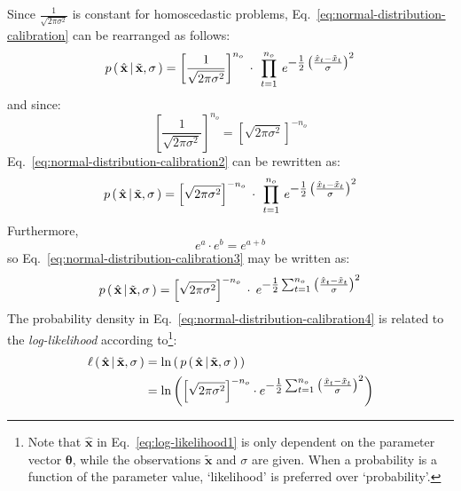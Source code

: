 \vspace{1em}
Since $\frac{1}{\sqrt{2\pi\sigma^2}}$ is constant for homoscedastic problems, Eq.~\ref{eq:normal-distribution-calibration} can be rearranged as follows:
\begin{equation}\label{eq:normal-distribution-calibration2}
p\,(\,\hat{\mathbf{x}}\,|\,\tilde{\mathbf{x}},\sigma\,) = \left[\frac{1}{\sqrt{2\pi\sigma^2}}\right]^{n_o}\:\cdot{}\:\prod_{t=1}^{n_o}\:e^\mathlarger{-\frac{1}{2}\left(\frac{\hat{x}_t-\tilde{x}_t}{\sigma}\right)^2}
\end{equation}
and since:
\begin{equation}
\left[\frac{1}{\sqrt{2\pi\sigma^2}}\right]^{n_o} = \left[\sqrt{2\pi\sigma^2}\right]^{-n_o} \nonumber
\end{equation}
Eq.~\ref{eq:normal-distribution-calibration2} can be rewritten as:
\begin{equation}\label{eq:normal-distribution-calibration3}
p\,(\,\hat{\mathbf{x}}\,|\,\tilde{\mathbf{x}},\sigma\,) = \left[\sqrt{2\pi\sigma^2}\right]^{-n_o}\:\cdot{}\:\prod_{t=1}^{n_o}\:e^\mathlarger{-\frac{1}{2}\left(\frac{\hat{x}_t-\tilde{x}_t}{\sigma}\right)^2}
\end{equation}
Furthermore,
\begin{equation}
e^a\cdot{}e^b=e^{a+b}
\end{equation}
so Eq.~\ref{eq:normal-distribution-calibration3} may be written as:
\begin{equation}\label{eq:normal-distribution-calibration4}
p\,(\,\hat{\mathbf{x}}\,|\,\tilde{\mathbf{x}},\sigma\,) = \left[\sqrt{2\pi\sigma^2}\right]^{-n_o}\:\cdot{}\:e^\mathlarger{-\frac{1}{2}\sum_{t=1}^{n_o}\left(\frac{\hat{x}_t-\tilde{x}_t}{\sigma}\right)^2}
\end{equation}
The probability density in Eq.~\ref{eq:normal-distribution-calibration4} is related to the \textit{log-likelihood} according to\footnote{Note that $\hat{\mathbf{x}}$ in Eq.~\ref{eq:log-likelihood1} is only dependent on the parameter vector  $\boldsymbol\theta$, while the observations $\tilde{\mathbf{x}}$ and $\sigma$ are given. When a probability is a function of the parameter value, `likelihood' is preferred over `probability'.}:
\begin{align}\label{eq:log-likelihood1}
\ell\,(\,\hat{\mathbf{x}}\,|\,\tilde{\mathbf{x}},\sigma\,) &= \mathrm{ln}\left(\,p\,(\,\hat{\mathbf{x}}\,|\,\tilde{\mathbf{x}},\sigma\,)\,\right)\\
&=\mathrm{ln}\left(\left[\sqrt{2\pi\sigma^2}\right]^{-n_o}\cdot{}e^\mathlarger{-\frac{1}{2}\sum_{t=1}^{n_o}\left(\frac{\hat{x}_t-\tilde{x}_t}{\sigma}\right)^2}
\right)
\end{align}
